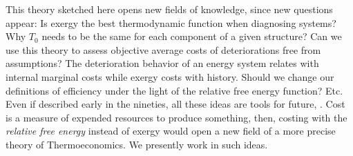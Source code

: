 \documentclass[energies,article,submit,moreauthors,pdftex]{Definitions/mdpi}
\begin{document}
This theory sketched here opens new fields of knowledge, since new questions appear:  Is exergy the best thermodynamic function when diagnosing systems? Why $T_0$ needs to be the same for each component of a given structure? Can we use this theory to assess objective average costs of deteriorations free from assumptions? The deterioration behavior of an energy system relates with internal marginal costs while exergy costs with history. Should we change our definitions of efficiency under the light of the relative free energy function? Etc. Even if described early in the nineties, all these ideas are tools for future, \cite{Naredo2000}. Cost is a measure of expended resources to produce something, then, costing with the \emph{relative free energy} instead of exergy would open a new field of a more precise theory of Thermoeconomics. We presently work in such ideas.
\vspace{12pt}

\end{document}
